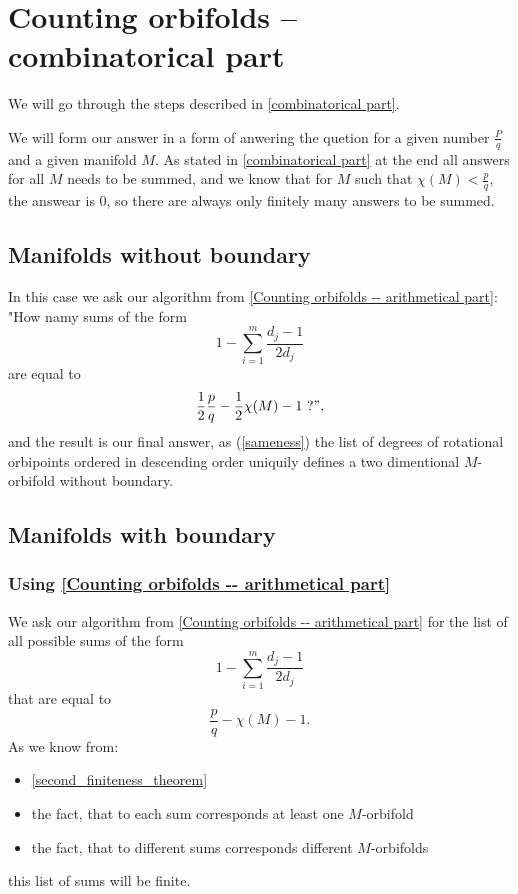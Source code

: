 \chapter{Counting orbifolds -- combinatorical part}\label{Counting orbifolds -- combinatorical part}
We will go through the steps described in \ref{combinatorical part}.

We will form our answer in a form of anwering the 
quetion for a given number $\frac{P}{q}$ and a given manifold $M$. 
As stated in \ref{combinatorical part} at the end all answers for all $M$ needs to be summed, 
and we know that for $M$ such that $\chi(M) < \frac{p}{q}$, the answear is $0$, so there 
are always only finitely many answers to be summed. 

\section{Manifolds without boundary}
In this case we ask our algorithm from \ref{Counting orbifolds -- arithmetical part}: 
"How namy sums of the form
\begin{equation}
1-\sum_{i=1}^m \frac{d_j-1}{2d_j} 
\end{equation}
are equal to 
\begin{equation}
\frac{1}{2}\frac{p}{q} - \frac{1}{2}\chi(M) -1\ ?",
\end{equation}
and the result is our final answer, as (\ref{sameness}) the list of degrees of rotational orbipoints ordered 
in descending order uniquily defines a two dimentional $M$-orbifold without boundary. 
\section{Manifolds with boundary}
\subsection{Using \ref{Counting orbifolds -- arithmetical part}}\label{use algorithm step}
We ask our algorithm from \ref{Counting orbifolds -- arithmetical part} for the list 
of all possible sums of the form
\begin{equation}
1-\sum_{i=1}^m \frac{d_j-1}{2d_j} 
\end{equation}
that are equal to 
\begin{equation}
\frac{p}{q} - \chi(M) - 1. 
\end{equation}
As we know from: 
\begin{itemize}
\item \ref{second_finiteness_theorem} 
\item the fact, that to each 
sum corresponds at least one $M$-orbifold
\item the fact, that to different sums corresponds different $M$-orbifolds
\end{itemize}
this list of sums will be finite. 

